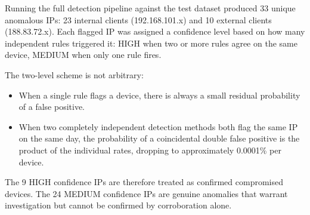 \documentclass[
  11pt,
]{article}
\begin{document}
Running the full detection pipeline against the test dataset produced 33
unique anomalous IPs: 23 internal clients (192.168.101.x) and 10 external
clients (188.83.72.x). Each flagged IP was assigned a confidence level
based on how many independent rules triggered it: HIGH when two or more
rules agree on the same device, MEDIUM when only one rule fires.

The two-level scheme is not arbitrary:
\begin{itemize}
  \item When a single rule flags a device, there is always a small residual probability of a false positive.
  \item When two completely independent detection methods both flag the same IP on the same day, the probability of a coincidental double false positive is the product of the individual rates, dropping to approximately 0.0001\% per device.
\end{itemize}

The 9 HIGH confidence IPs are therefore treated as confirmed compromised
devices. The 24 MEDIUM confidence IPs are genuine anomalies that warrant
investigation but cannot be confirmed by corroboration alone.
\end{document}
